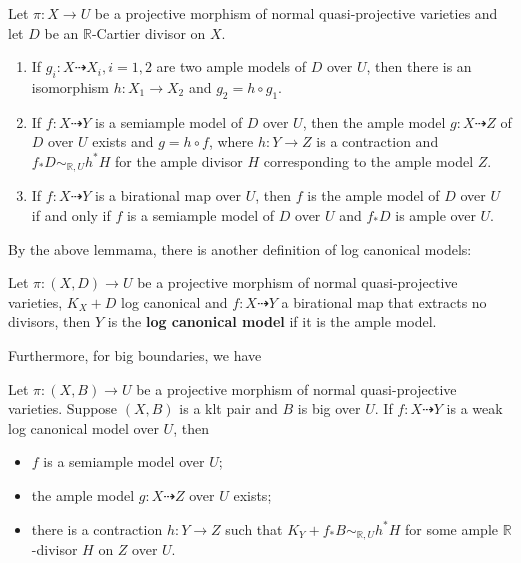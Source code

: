 \begin{lemma}\cite[lemmama 3.6.6]{BCHM10}
	Let $\pi:X \to U$ be a projective morphism of normal quasi-projective varieties and let $D$ be an $\mathbb{R}$-Cartier divisor on $X$.
	\begin{enumerate}
		\item If $g_{i}:X \dashrightarrow X_{i}, i=1,2$ are two ample models of $D$ over $U$, then there is an isomorphism $h:X_{1}\to X_{2}$ and $g_{2}=h \circ g_{1}$.
		\item If $f:X \dashrightarrow Y$ is a semiample model of $D$ over $U$, then the ample model $g:X \dashrightarrow  Z$ of $D$ over $U$   exists and $g=h \circ f$, where $h:Y \to Z$ is a contraction and $f_*D \sim_{\mathbb{R},U}h^*H$ for the ample divisor $H$ corresponding to the ample model $Z$.
		\item  If $f:X \dashrightarrow Y$ is a birational map over $U$, then $f$ is the ample model of $D$ over $U$ if and only if $f$ is a semiample model of $D$ over $U$ and $f_*D$ is ample over $U$.
	\end{enumerate}
\end{lemma}

By the above lemmama, there is another definition of log canonical models:

\begin{definition}
	Let $ \pi:(X, D)\to U $ be a projective morphism of normal quasi-projective varieties, $ K_X+D $ log canonical and $ f: X\dashrightarrow Y $  a birational map that extracts no divisors, then $ Y $ is the \textbf{log canonical model} if it is the ample model.
\end{definition}

Furthermore, for big boundaries, we have
\begin{lemma}\cite[lemmama 3.9.3]{BCHM10} Let $ \pi:(X,B)\to U $ be a projective morphism of normal quasi-projective varieties. Suppose $(X, B)$ is a klt pair and  $B$ is big over $U$. If $f:X\dashrightarrow Y$ is a weak log canonical model over $U$, then
	\begin{itemize}
		\item $f$ is a semiample model over $U$;
		\item  the ample model $g:X \dashrightarrow Z$ over $U$ exists;
		\item  there is a contraction $h:Y\to Z$ such that $K_{Y}+f_*B\sim_{\mathbb{R},U} h^*H$ for some ample $\mathbb{R}$-divisor $H$ on $Z$ over $U$.
	\end{itemize}
\end{lemma}

